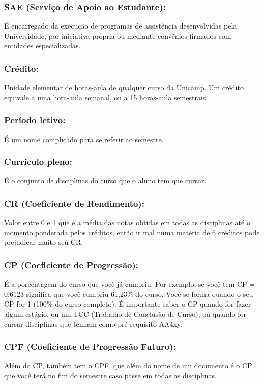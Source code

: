 \subsubsection{SAE (Serviço de Apoio ao Estudante):} É encarregado da execução
de programas de assistência desenvolvidas pela Universidade, por iniciativa
própria ou mediante convênios firmados com entidades especializadas.

\subsubsection{Crédito:} Unidade elementar de horas-aula de qualquer curso da
Unicamp. Um crédito equivale a uma hora-aula semanal, ou a 15 horas-aula
semestrais.

\subsubsection{Período letivo:} É um nome complicado para se referir ao
semestre.

\subsubsection{Currículo pleno:} É o conjunto de disciplinas do curso que o
aluno tem que cursar.

\subsubsection{CR (Coeficiente de Rendimento):} Valor entre 0 e 1 que é a média
das notas obtidas em todas as disciplinas até o momento ponderada pelos
créditos, então ir mal numa matéria de 6 créditos pode prejudicar muito seu CR.

\subsubsection{CP (Coeficiente de Progressão):} É a porcentagem do curso que
você já cumpriu. Por exemplo, se você tem CP = 0,6123 significa que você
cumpriu 61,23\% do curso. Você se forma quan\-do o seu CP for 1 (100\% do curso
completo). É importante saber o CP quando for fazer algum estágio, ou um TCC
(Trabalho de Conclusão de Curso), ou quando for cursar disciplinas que tenham
como pré-requisito AA4xy.

\subsubsection{CPF (Coeficiente de Progressão Futuro):} Além do CP, também tem
o CPF, que além do nome de um documento é o CP que você terá no fim do semestre
caso passe em todas as disciplinas.

